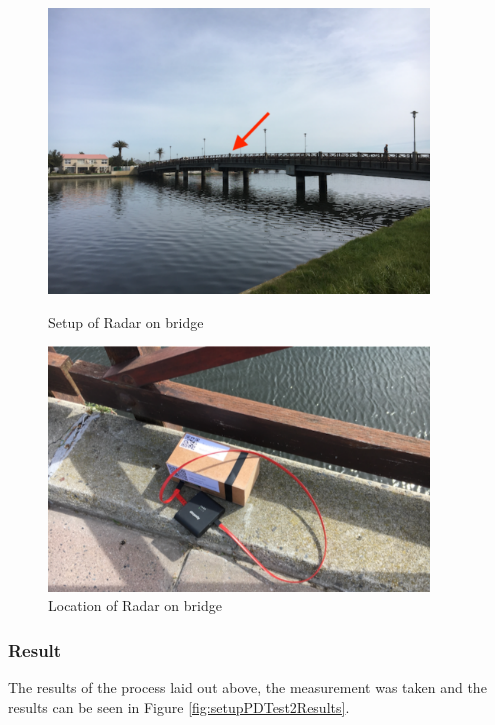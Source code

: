 \begin{figure}[h!]
    \centering
    \begin{minipage}{0.45\textwidth}
        \centering
        \includegraphics[width = 0.9\textwidth]{images/setupPDTest2.pdf}
    \caption{Setup of Radar on bridge}\label{fig:setupPDTest2}
    \end{minipage}\hfill
    \begin{minipage}{0.45\textwidth}
        \centering
        \includegraphics[width=0.9\textwidth]{images/setupPDTest22.pdf}
        \caption{Location of Radar on bridge}\label{fig:pulsedTest22}
    \end{minipage}
\end{figure}

\subsubsection{Result}
The results of the process laid out above, the measurement was taken and the results can be seen in Figure \ref{fig:setupPDTest2Results}.


